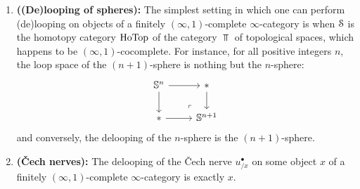                 \begin{example}
                    \noindent
                    \begin{enumerate}
                        \item \textbf{((De)looping of spheres):} The simplest setting in which one can perform (de)looping on objects of a finitely $(\infty, 1)$-complete $\infty$-category is when $\S$ is the homotopy category $\Ho\Top$ of the category $\Top$ of topological spaces, which happens to be $(\infty, 1)$-cocomplete. For instance, for all positive integers $n$, the loop space of the $(n + 1)$-sphere is nothing but the $n$-sphere:
                            $$
                                \begin{tikzcd}
                                	{\bbS^n} & {*} \\
                                	{*} & {\bbS^{n + 1}}
                                	\arrow[from=1-1, to=2-1]
                                	\arrow[from=2-1, to=2-2]
                                	\arrow[from=1-1, to=1-2]
                                	\arrow[from=1-2, to=2-2]
                                	\arrow["\lrcorner"{anchor=center, pos=0.125, rotate=180}, draw=none, from=2-2, to=1-1]
                                \end{tikzcd}
                            $$
                        and conversely, the delooping of the $n$-sphere is the $(n + 1)$-sphere.
                        \item \textbf{(\v{C}ech nerves):} The delooping of the \v{C}ech nerve $u^{\bullet}_{/x}$ on some object $x$ of a finitely $(\infty, 1)$-complete $\infty$-category is exactly $x$. 
                    \end{enumerate}
                \end{example}
                
